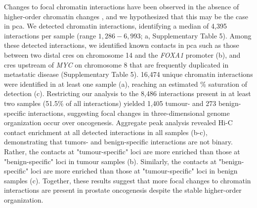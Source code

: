 Changes to focal chromatin interactions have been observed in the absence of higher-order chromatin changes \cite{takayamaTransitionQuiescentActivated2021,johnstoneLargeScaleTopologicalChanges2020}, and we hypothesized that this may be the case in \gls{pca}.
We detected chromatin interactions, identifying a median of 4,395 interactions per sample (range $1,286 - 6,993$; a, Supplementary Table 5).
Among these detected interactions, we identified known contacts in \gls{pca} such as those between two distal \glspl{cre} on chromosome 14 and the \emph{FOXA1} promoter \cite{zhouNoncodingMutationsTarget2020} (b), and \glspl{cre} upstream of \emph{MYC} on chromosome 8 that are frequently duplicated in metastatic disease \cite{quigleyGenomicHallmarksStructural2018} (Supplementary Table 5).
16,474 unique chromatin interactions were identified in at least one sample (a), reaching an estimated \% saturation of detection (c).
Restricting our analysis to the 8,486 interactions present in at least two samples (51.5\% of all interactions) yielded 1,405 tumour- and 273 benign-specific interactions, suggesting focal changes in three-dimensional genome organization occur over oncogenesis.
Aggregate peak analysis revealed Hi-C contact enrichment at all detected interactions in all samples (b-c), demonstrating that tumors- and benign-specific interactions are not binary.
Rather, the contacts at "tumour-specific" loci are more enriched than those at "benign-specific" loci in tumour samples (b).
Similarly, the contacts at "benign-specific" loci are more enriched than those at "tumour-specific" loci in benign samples (c).
Together, these results suggest that more focal changes to chromatin interactions are present in prostate oncogenesis despite the stable higher-order organization.


